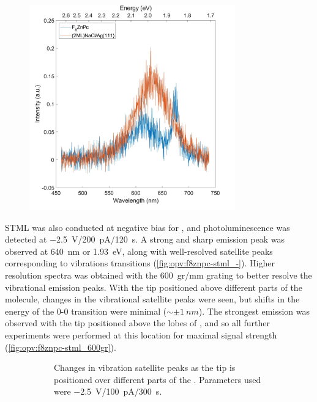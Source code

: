 \begin{figure} [h]
    \centering
        \includegraphics[width=3.5in]{pictures/f8znpc_3V_250pA_60s.jpg}
    \caption{}
    \label{fig:opv:f8znpc-stml_+}
\end{figure}

\ac{STML} was also conducted at negative bias for , and photoluminescence was detected at \SI{-2.5}{V}/\SI{200}{pA}/\SI{120}{s}. A strong and sharp emission peak was observed at \SI{640}{nm} or \SI{1.93}{eV}, along with well-resolved satellite peaks corresponding to vibrations transitions (\autoref{fig:opv:f8znpc-stml_-}). Higher resolution spectra was obtained with the \SI{600}{gr/mm} grating to better resolve the vibrational emission peaks. With the tip positioned above different parts of the molecule, changes in the vibrational satellite peaks were seen, but shifts in the energy of the 0-0 transition were minimal ($\sim \pm \SI{1}{nm}$). The strongest emission was observed with the tip positioned above the lobes of , and so all further experiments were performed at this location for maximal signal strength (\autoref{fig:opv:f8znpc-stml_600gr}).


\begin{figure} [h]
    \centering
    
     \begin{subfigure}{0.45\textwidth}
        \caption{}
        \label{fig:opv:f8znpc-stml_-}
    \end{subfigure}
    
    \begin{subfigure}{0.45\textwidth}
        \caption{Changes in vibration satellite peaks as the tip is positioned over different parts of the . Parameters used were \SI{-2.5}{V}/\SI{100}{pA}/\SI{300}{s}.}
        \label{fig:opv:f8znpc-stml_600gr}
    \end{subfigure}
    
    \caption{}
    
\end{figure}

